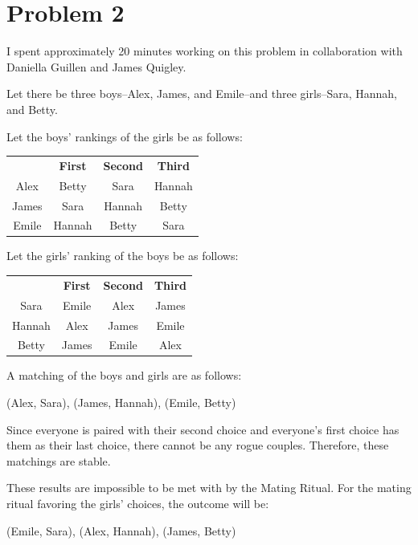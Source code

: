 \documentclass{article}
\begin{document}
\section*{Problem 2}

I spent approximately 20 minutes working on this problem in collaboration with
Daniella Guillen and James Quigley.

\bigbreak

Let there be three boys--Alex, James, and Emile--and three girls--Sara, Hannah,
and Betty.

\bigbreak

Let the boys' rankings of the girls be as follows:
\begin{center}
  \begin{tabular}{ c | c c c }
    & \textbf{First} & \textbf{Second} & \textbf{Third} \\
    Alex & Betty & Sara & Hannah \\
    James & Sara & Hannah & Betty \\
    Emile & Hannah & Betty & Sara
  \end{tabular}
\end{center}

Let the girls' ranking of the boys be as follows:
\begin{center}
  \begin{tabular}{ c | c c c }
    & \textbf{First} & \textbf{Second} & \textbf{Third} \\
    Sara & Emile & Alex & James \\
    Hannah & Alex & James & Emile \\
    Betty & James & Emile & Alex
  \end{tabular}
\end{center}

A matching of the boys and girls are as follows:
\begin{center}
  (Alex, Sara), (James, Hannah), (Emile, Betty)
\end{center}

Since everyone is paired with their second choice and everyone's first choice
has them as their last choice, there cannot be any rogue couples. Therefore,
these matchings are stable.

\bigbreak

These results are impossible to be met with by the Mating Ritual. For the mating
ritual favoring the girls' choices, the outcome will be:
\begin{center}
  (Emile, Sara), (Alex, Hannah), (James, Betty)
\end{center}
\end{document}

